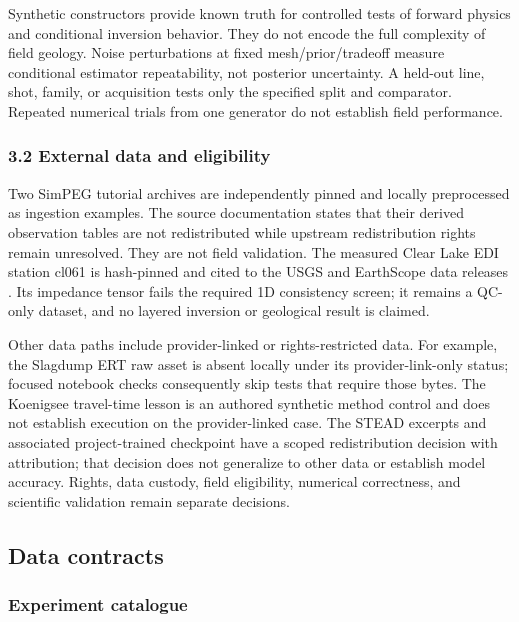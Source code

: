 Synthetic constructors provide known truth for controlled tests of
forward physics and conditional inversion behavior. They do not encode
the full complexity of field geology. Noise perturbations at fixed
mesh/prior/tradeoff measure conditional estimator repeatability, not
posterior uncertainty. A held-out line, shot, family, or acquisition
tests only the specified split and comparator. Repeated numerical trials
from one generator do not establish field performance.

\subsubsection{3.2 External data and
eligibility}\label{external-data-and-eligibility}

Two SimPEG tutorial archives are independently pinned and locally
preprocessed as ingestion examples. The source documentation states that
their derived observation tables are not redistributed while upstream
redistribution rights remain unresolved. They are not field validation.
The measured Clear Lake EDI station cl061 is hash-pinned and cited to
the USGS and EarthScope data releases
\cite{usgsClearLake,earthscopeClearLake}. Its impedance tensor fails the
required 1D consistency screen; it remains a QC-only dataset, and no
layered inversion or geological result is claimed.

Other data paths include provider-linked or rights-restricted data. For
example, the Slagdump ERT raw asset is absent locally under its
provider-link-only status; focused notebook checks consequently skip
tests that require those bytes. The Koenigsee travel-time lesson is an
authored synthetic method control and does not establish execution on
the provider-linked case. The STEAD excerpts \cite{mousavi2019} and
associated project-trained checkpoint have a scoped redistribution
decision with attribution; that decision does not generalize to other
data or establish model accuracy. Rights, data custody, field
eligibility, numerical correctness, and scientific validation remain
separate decisions.

\subsection{Data contracts}

\subsubsection{Experiment catalogue}\label{contract-catalog}

